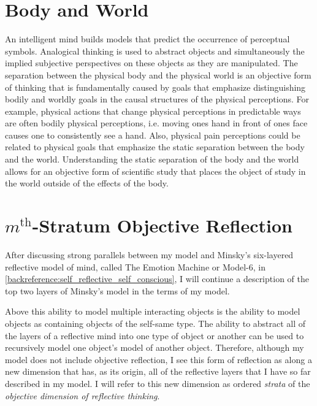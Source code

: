 \section{Body and World}

An intelligent mind builds models that predict the occurrence of
perceptual symbols.  Analogical thinking is used to abstract objects
and simultaneously the implied subjective perspectives on these
objects as they are manipulated.  The separation between the physical
body and the physical world is an objective form of thinking that is
fundamentally caused by goals that emphasize distinguishing bodily and
worldly goals in the causal structures of the physical perceptions.
For example, physical actions that change physical perceptions in
predictable ways are often bodily physical perceptions, i.e. moving
ones hand in front of ones face causes one to consistently see a hand.
Also, physical pain perceptions could be related to physical goals
that emphasize the static separation between the body and the world.
Understanding the static separation of the body and the world allows
for an objective form of scientific study that places the object of
study in the world outside of the effects of the body.

\section{$m^\text{th}$-Stratum Objective Reflection}

\label{section:model_6_future_research}

After discussing strong parallels between my model and Minsky's
six-layered reflective model of mind, called The Emotion Machine or
Model-6, in \autoref{backreference:self_reflective_self_conscious}, I
will continue a description of the top two layers of Minsky's model in
the terms of my model.

Above this ability to model multiple interacting objects is the
ability to model objects as containing objects of the self-same type.
The ability to abstract all of the layers of a reflective mind into
one type of object or another can be used to recursively model one
object's model of another object.  Therefore, although my model does
not include objective reflection, I see this form of reflection as
along a new dimension that has, as its origin, all of the reflective
layers that I have so far described in my model.  I will refer to this
new dimension as ordered \emph{strata} of the \emph{objective
  dimension of reflective thinking}.


